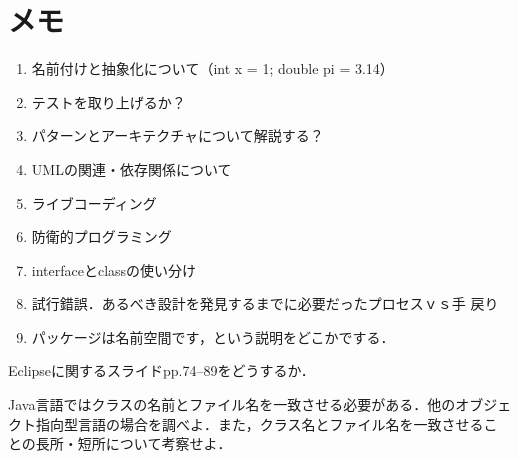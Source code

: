\documentclass[a4j,papersize]{jsbook}
\begin{document}
\newpage

\newpage


\chapter{メモ}

\begin{enumerate}
 \item 名前付けと抽象化について（int x = 1; double pi = 3.14）
 \item テストを取り上げるか？
 \item パターンとアーキテクチャについて解説する？
 \item UMLの関連・依存関係について
 \item ライブコーディング
 \item 防衛的プログラミング
 \item interfaceとclassの使い分け
 \item 試行錯誤．あるべき設計を発見するまでに必要だったプロセスｖｓ手
       戻り
 \item パッケージは名前空間です，という説明をどこかでする．
\end{enumerate}

Eclipseに関するスライドpp.74--89をどうするか．


\begin{演習}
 Java言語ではクラスの名前とファイル名を一致させる必要がある．他のオブジェ
 クト指向型言語の場合を調べよ．また，クラス名とファイル名を一致させるこ
 との長所・短所について考察せよ．
\end{演習}
\end{document}
